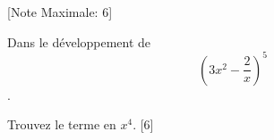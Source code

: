 \begin{question}
  \hspace*{\fill} [Note Maximale: 6]\par
  \medskip
  \noindent Dans le développement de $$\left(3x^2 - \frac{2}{x} \right)^5$$.\hspace*{\fill}\par
  \medskip
  \noindent Trouvez le terme en $x^4$.\hspace*{\fill} [6]\par
\end{question}
